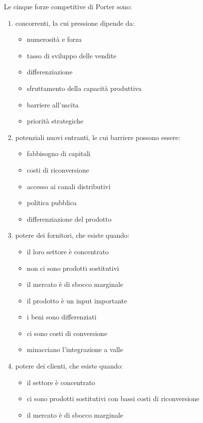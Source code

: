 \documentclass[answers, a4paper, 11pt]{exam}
\begin{document}
Le cinque forze competitive di Porter sono:
\begin{enumerate}
    \item concorrenti, la cui pressione dipende da:
    \begin{itemize}
        \item numerosità e forza 
        \item tasso di sviluppo delle vendite
        \item differenziazione
        \item sfruttamento della capacità produttiva
        \item barriere all'uscita
        \item priorità strategiche
    \end{itemize}
    \item potenziali nuovi entranti, le cui barriere possono essere:
    \begin{itemize}
        \item fabbisogno di capitali
        \item costi di riconversione
        \item accesso ai canali distributivi
        \item politica pubblica
        \item differenziazione del prodotto
    \end{itemize}
    \item potere dei fornitori, che esiste quando:
    \begin{itemize}
        \item il loro settore è concentrato
        \item non ci sono prodotti sostitutivi
        \item il mercato è di sbocco marginale
        \item il prodotto è un input importante
        \item i beni sono differenziati
        \item ci sono costi di conversione
        \item minacciano l'integrazione a valle
    \end{itemize}
    \item potere dei clienti, che esiste quando:
    \begin{itemize}
        \item il settore è concentrato
        \item ci sono prodotti sostitutivi con bassi costi di riconversione
        \item il mercato è di sbocco marginale

\end{itemize}
\end{enumerate}
\end{document}
